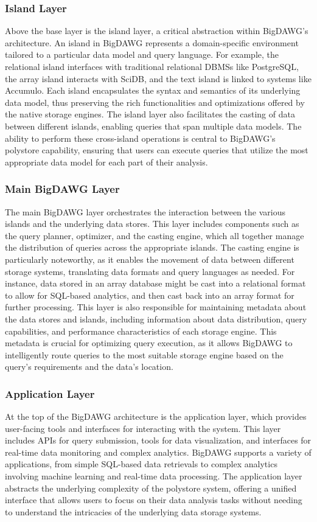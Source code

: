 \subsubsection{Island Layer}
Above the base layer is the island layer, a critical abstraction within \ac{BigDAWG}'s architecture. An island in \ac{BigDAWG} represents a domain-specific environment tailored to a particular data model and query language. For example, the relational island interfaces with traditional relational \ac{DBMS}s like PostgreSQL, the array island interacts with SciDB, and the text island is linked to systems like Accumulo. Each island encapsulates the syntax and semantics of its underlying data model, thus preserving the rich functionalities and optimizations offered by the native storage engines. The island layer also facilitates the casting of data between different islands, enabling queries that span multiple data models. The ability to perform these cross-island operations is central to \ac{BigDAWG}'s polystore capability, ensuring that users can execute queries that utilize the most appropriate data model for each part of their analysis.
\subsubsection{Main BigDAWG Layer}
The main \ac{BigDAWG} layer orchestrates the interaction between the various islands and the underlying data stores. This layer includes components such as the query planner, optimizer, and the casting engine, which all together manage the distribution of queries across the appropriate islands. The casting engine is particularly noteworthy, as it enables the movement of data between different storage systems, translating data formats and query languages as needed. For instance, data stored in an array database might be cast into a relational format to allow for SQL-based analytics, and then cast back into an array format for further processing.
This layer is also responsible for maintaining metadata about the data stores and islands, including information about data distribution, query capabilities, and performance characteristics of each storage engine. This metadata is crucial for optimizing query execution, as it allows \ac{BigDAWG} to intelligently route queries to the most suitable storage engine based on the query's requirements and the data's location.
\subsubsection{Application Layer}
At the top of the \ac{BigDAWG} architecture is the application layer, which provides user-facing tools and interfaces for interacting with the system. This layer includes APIs for query submission, tools for data visualization, and interfaces for real-time data monitoring and complex analytics. \ac{BigDAWG} supports a variety of applications, from simple SQL-based data retrievals to complex analytics involving machine learning and real-time data processing. The application layer abstracts the underlying complexity of the polystore system, offering a unified interface that allows users to focus on their data analysis tasks without needing to understand the intricacies of the underlying data storage systems.
